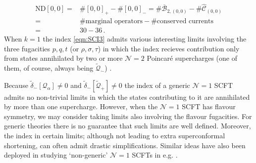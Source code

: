 \documentclass[main.tex]{subfiles}
\begin{document}
\begin{equation}
\begin{aligned}
\text{ND}[0,0]=&\#[0,0]_+-\#[0,0]_-=\#\overline{\mathcal{B}}_{2,(0,0)}-\#\hat{\mathcal{C}}_{(0,0)}\\
=&\#\text{marginal operators}-\#\text{conserved currents}\\
=&30-36\,.
\end{aligned}
\end{equation}
When $k=1$ the index \eqref{eqn:SCI3} admits various interesting limits involving the three fugacities $p,q,t$ (or $\rho,\sigma,\tau$) in which the index recieves contribution only from states annihilated by two or more $\mathcal{N}=2$ Poincar\'e supercharges (one of them, of course, always being $\widetilde{\mathcal{Q}}_{\dot-}$) \cite{Gadde:2011uv}. 

Because $\widetilde{\delta}_{\dot-}[\mathcal{Q}_{\alpha}]\neq 0$ and $\widetilde{\delta}_{\dot-}[\widetilde{\mathcal{Q}}_{\dot+}]\neq0$ the index of a generic $\mathcal{N}=1$ SCFT admits no non-trivial limits in which the states contributing to it are annihilated by more than one supercharge. However, when the $\mathcal{N}=1$ SCFT has flavour symmetry, we may consider taking limits also involving the flavour fugacities. For generic theories there is no guarantee that such limits are well defined. Moreover, the index in certain limits; although not leading to extra superconformal shortening, can often admit drastic simplifications. Similar ideas have also been deployed in studying `non-generic' $\mathcal{N}=1$ SCFTs in e.g. \cite{Beem:2012yn,Gaiotto:2015usa,Rastelli:2016tbz}.
\end{document}
